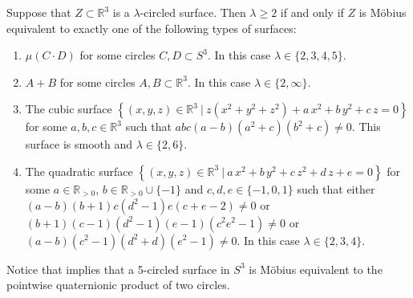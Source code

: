 \documentclass[11pt]{article}
\newcommand{\R}{\mathbb{R}}
\newcommand{\set}[2]{\left\{#1 ~|~ #2\right\}}
\newcommand{\st}{such that }
\begin{document}
\begin{corollary}
\label{cor:c}
Suppose that $Z\subset\R^3$ is a $\lambda$-circled surface.
Then $\lambda\geq 2$ if and only if
$Z$ is M\"obius equivalent to exactly one of the following types of surfaces:
\begin{enumerate}[topsep=0pt,itemsep=2pt,label=(\roman*),ref=(\roman*)]
\item\label{c:i} $\mu(C\cdot D)$ for some circles $C,D\subset S^3$. In this case $\lambda\in\{2,3,4,5\}$.
\item\label{c:ii} $A+B$ for some circles $A,B\subset\R^3$. In this case $\lambda\in\{2,\infty\}$.
\item\label{c:iii} The cubic surface
$
\set{(x,y,z)\in\R^3}{z(x^2+y^2+z^2)+a\,x^2+b\,y^2+c\,z=0}
$
for some $a,b,c\in \R^3$ \st
$abc(a-b)(a^2+c)(b^2+c)\neq 0$.
This surface is smooth and $\lambda\in\{2,6\}$.

\item\label{c:iv} The quadratic surface
$
\set{(x,y,z)\in\R^3}{a\,x^2+b\,y^2+c\,z^2+d\,z+e=0}
$
for some $a\in\R_{>0}$, $b\in\R_{>0}\cup\{-1\}$ and $c,d,e\in\{-1,0,1\}$
\st either
\\
$(a-b)(b+1)c(d^2-1)e(c+e-2)\neq 0$ or
$(b+1)(c-1)(d^2-1)(e-1)(c^2e^2-1)\neq 0$ or
$(a-b)(c^2-1)(d^2+d)(e^2-1)\neq 0$.
In this case $\lambda\in\{2,3,4\}$.
\end{enumerate}
\end{corollary}

Notice that  implies that a 5-circled surface in $S^3$ is
M\"obius equivalent to the pointwise quaternionic product of two circles.
\end{document}
